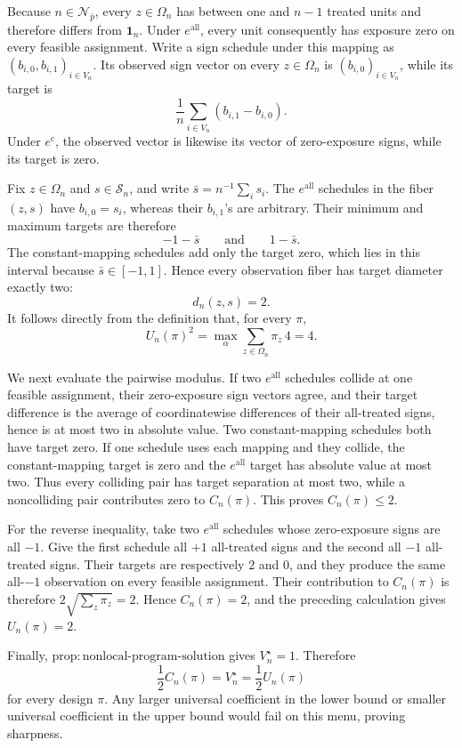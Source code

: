 Because \(n\in\mathcal N_{\bar p}\), every \(z\in\Omega_n\) has between one and \(n-1\) treated units and therefore differs from \(\mathbf 1_n\).  Under \(e^{\mathrm{all}}\), every unit consequently has exposure zero on every feasible assignment.  Write a sign schedule under this mapping as \((b_{i,0},b_{i,1})_{i\in V_n}\).  Its observed sign vector on every \(z\in\Omega_n\) is \((b_{i,0})_{i\in V_n}\), while its target is
\[
 \frac1n\sum_{i\in V_n}(b_{i,1}-b_{i,0}).
\]
Under \(e^{\mathrm c}\), the observed vector is likewise its vector of zero-exposure signs, while its target is zero.

Fix \(z\in\Omega_n\) and \(s\in\mathcal S_n\), and write \(\bar s=n^{-1}\sum_i s_i\).  The \(e^{\mathrm{all}}\) schedules in the fiber \((z,s)\) have \(b_{i,0}=s_i\), whereas their \(b_{i,1}\)'s are arbitrary.  Their minimum and maximum targets are therefore
\[
 -1-\bar s
 \qquad\text{and}\qquad
 1-\bar s.
\]
The constant-mapping schedules add only the target zero, which lies in this interval because \(\bar s\in[-1,1]\).  Hence every observation fiber has target diameter exactly two:
\[
 d_n(z,s)=2.
\]
It follows directly from the definition that, for every \(\pi\),
\[
 U_n(\pi)^2
 =\max_\alpha\sum_{z\in\Omega_n}\pi_z\,4
 =4.
\]

We next evaluate the pairwise modulus.  If two \(e^{\mathrm{all}}\) schedules collide at one feasible assignment, their zero-exposure sign vectors agree, and their target difference is the average of coordinatewise differences of their all-treated signs, hence is at most two in absolute value.  Two constant-mapping schedules both have target zero.  If one schedule uses each mapping and they collide, the constant-mapping target is zero and the \(e^{\mathrm{all}}\) target has absolute value at most two.  Thus every colliding pair has target separation at most two, while a noncolliding pair contributes zero to \(C_n(\pi)\).  This proves \(C_n(\pi)\le2\).

For the reverse inequality, take two \(e^{\mathrm{all}}\) schedules whose zero-exposure signs are all \(-1\).  Give the first schedule all \(+1\) all-treated signs and the second all \(-1\) all-treated signs.  Their targets are respectively \(2\) and \(0\), and they produce the same all-\(-1\) observation on every feasible assignment.  Their contribution to \(C_n(\pi)\) is therefore \(2\sqrt{\sum_z\pi_z}=2\).  Hence \(C_n(\pi)=2\), and the preceding calculation gives \(U_n(\pi)=2\).

Finally, \(\mathrm{prop{:}nonlocal\text{-}program\text{-}solution}\) gives \(V_n^\star=1\).  Therefore
\[
 \frac12 C_n(\pi)=V_n^\star=\frac12 U_n(\pi)
\]
for every design \(\pi\).  Any larger universal coefficient in the lower bound or smaller universal coefficient in the upper bound would fail on this menu, proving sharpness.